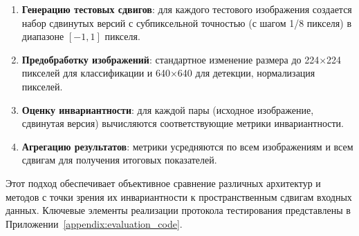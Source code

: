\begin{enumerate}
    \item \textbf{Генерацию тестовых сдвигов}: для каждого тестового изображения создается набор сдвинутых версий с субпиксельной точностью (с шагом 1/8 пикселя) в диапазоне $[-1, 1]$ пикселя.
    
    \item \textbf{Предобработку изображений}: стандартное изменение размера до 224×224 пикселей для классификации и 640×640 для детекции, нормализация пикселей.
    
    \item \textbf{Оценку инвариантности}: для каждой пары (исходное изображение, сдвинутая версия) вычисляются соответствующие метрики инвариантности.
    
    \item \textbf{Агрегацию результатов}: метрики усредняются по всем изображениям и всем сдвигам для получения итоговых показателей.
\end{enumerate}

Этот подход обеспечивает объективное сравнение различных архитектур и методов с точки зрения их инвариантности к пространственным сдвигам входных данных. Ключевые элементы реализации протокола тестирования представлены в Приложении~\ref{appendix:evaluation_code}.

\newpage
